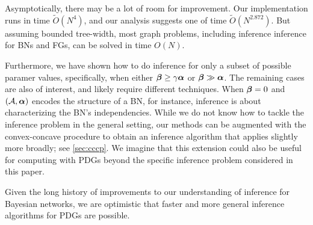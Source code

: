 Asymptotically, there may be a lot of room for improvement.
Our implementation runs in time $\tilde O(N^4)$, and our analysis suggests one of time $\tilde O(N^{2.872})$. 
But assuming bounded tree-width, most graph problems, including
inference inference for BNs and FGs, can be solved in time $O(N)$. 


Furthermore, we have shown how to do inference for only a subset of
possible paramer values, specifically, 
when
either $\boldsymbol\beta \ge \gamma \boldsymbol\alpha$ or $\boldsymbol\beta \gg \boldsymbol\alpha$. 
The remaining cases are also of interest, and likely require different techniques. 
When $\boldsymbol\beta = 0$ and $(\mathcal A, \boldsymbol\alpha)$ encodes the structure of a BN,
    for instance,
    inference is about characterizing the BN's independencies.
While we do not know how to tackle 
the inference problem in the general setting, 
our methods can be augmented with the convex-concave procedure 
    \parencite{yuille2003concave} to obtain an inference
    algorithm that applies slightly more broadly; see \cref{sec:cccp}.
We imagine that this extension could also be useful for computing with PDGs 
    beyond the specific inference problem considered in this paper.

Given the long history of improvements to our
understanding of inference for 
    Bayesian networks,
we are optimistic that 
    faster and more general
    inference algorithms
    for PDGs
    are possible.


